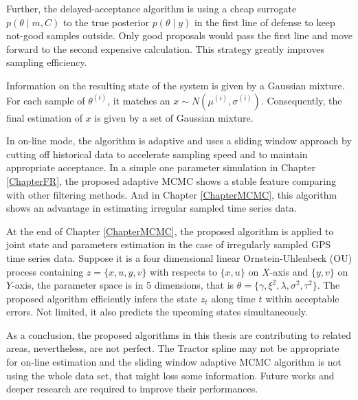 Further, the delayed-acceptance algorithm is using a cheap surrogate $p(\theta\mid m,C)$ to the true posterior $p(\theta\mid y)$ in the first line of defense to keep not-good samples outside. Only good proposals would pass the first line and move forward to the second expensive calculation. This strategy greatly improves sampling efficiency. 


Information on the resulting state of the system is given by a Gaussian mixture. For each sample of $\theta^{(i)}$, it matches an $x \sim N(\mu^{(i)},\sigma^{(i)})$. Consequently, the final estimation of $x$ is given by a set of Gaussian mixture. 


In on-line mode, the algorithm is adaptive and uses a sliding window approach by cutting off historical data to accelerate sampling speed and to maintain appropriate acceptance. In a simple one parameter simulation in Chapter \ref{ChapterFR}, the proposed adaptive MCMC shows a stable feature comparing with other filtering methods. And in Chapter \ref{ChapterMCMC}, this algorithm shows an advantage in estimating irregular sampled time series data. 


At the end of Chapter \ref{ChapterMCMC}, the proposed algorithm is applied to joint state and parameters estimation in the case of irregularly sampled GPS time series data. Suppose it is a four dimensional linear Ornstein-Uhlenbeck (OU) process containing $z=\{x,u,y,v\}$ with respects to $\{x,u\}$ on $X$-axis and $\{y,v\}$ on $Y$-axis, the parameter space is in 5 dimensions, that is $\theta=\{\gamma,\xi^2,\lambda,\sigma^2,\tau^2\}$. The proposed algorithm efficiently infers the state $z_t$ along time $t$ within acceptable errors. Not limited, it also predicts the upcoming states simultaneously. 


As a conclusion, the proposed algorithms in this thesis are contributing to related areas, nevertheless, are not perfect. The Tractor spline may not be appropriate for on-line estimation and the sliding window adaptive MCMC algorithm is not using the whole data set, that might loss some information. Future works and deeper research are required to improve their performances. 



